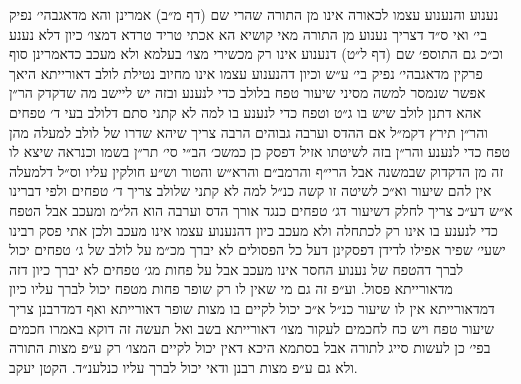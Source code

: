 \documentclass[12pt, openany]{book}
\begin{document}
\begin{multicols}{2}
נענוע והנענוע עצמו לכאורה אינו מן התורה שהרי שם (דף מ״ב) אמרינן והא מדאגבהי׳ נפיק בי׳ ואי ס״ד דצריך נענוע מן התורה מאי קושיא הא אכתי טריד טרדא דמצו׳ כיון דלא נענע וכ״כ גם התוספ׳ שם (דף ל״ט) דנענוע אינו רק מכשירי מצו׳ בעלמא ולא מעכב כדאמרינן סוף פרקין מדאגבהי׳ נפיק בי׳ ע״ש וכיון דהנענוע עצמו אינו מחיוב נטילת לולב דאורייתא היאך אפשר שנמסר למשה מסיני שיעור טפח בלולב כדי לנענע ובזה יש ליישב מה שדקדק הר״ן אהא דתנן לולב שיש בו ג״ט וטפח כדי לנענע בו למה לא קתני סתם דלולב בעי ד׳ טפחים והר״ן תירץ דקמ״ל אם ההדס וערבה גבוהים הרבה צריך שיהא שדרו של לולב למעלה מהן טפח כדי לנענע והר״ן בזה לשיטתו אזיל דפסק כן כמשכ׳ הב״י סי׳ תר״ן בשמו וכנראה שיצא לו זה מן הדקדוק שבמשנה אבל הרי״ף והרמב״ם והרא״ש והטור וש״ע חולקין עליו וס״ל דלמעלה אין להם שיעור וא״כ לשיטה זו קשה כנ״ל למה לא קתני שלולב צריך ד׳ טפחים ולפי דברינו א״ש דע״כ צריך לחלק דשיעור דג׳ טפחים כנגד אורך הדס וערבה הוא הל״מ ומעכב אבל הטפח כדי לנענע בו אינו רק לכתחלה ולא מעכב כיון דהנענוע עצמו אינו מעכב ולכן אתי פסק רבינו ישעי׳ שפיר אפילו לדידן דפסקינן דעל כל הפסולים לא יברך מכ״מ על לולב של ג׳ טפחים יכול לברך דהטפח של נענוע החסר אינו מעכב אבל על פחות מג׳ טפחים לא יברך כיון דזה מדאורייתא פסול. וע״פ זה גם מי שאין לו רק שופר פחות מטפח יכול לברך עליו כיון דמדאורייתא אין לו שיעור כנ״ל א״כ יכול לקיים בו מצות שופר דאורייתא ואף דמדרבנן צריך שיעור טפח ויש כח לחכמים לעקור מצו׳ דאורייתא בשב ואל תעשה זה דוקא באמרו חכמים בפי׳ כן לעשות סייג לתורה אבל בסתמא היכא דאין יכול לקיים המצו׳ רק ע״פ מצות התורה ולא גם ע״פ מצות רבנן ודאי יכול לברך עליו כנלענ״ד. הקטן יעקב.\\\vspace{0pt}

\end{multicols}\newpage
\end{document}
